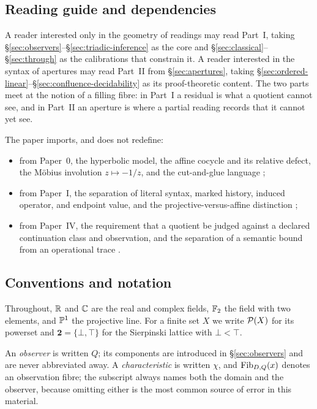 \subsection{Reading guide and dependencies}

A reader interested only in the geometry of readings may read Part~I, taking
\S\ref{sec:observers}--\S\ref{sec:triadic-inference} as the core and
\S\ref{sec:classical}--\S\ref{sec:through} as the calibrations that constrain it.
A reader interested in the syntax of apertures may read Part~II from
\S\ref{sec:apertures}, taking \S\ref{sec:ordered-linear}--\S\ref{sec:confluence-decidability}
as its proof-theoretic content.  The two parts meet at the notion of a filling fibre:
in Part~I a residual is what a quotient cannot see, and in Part~II an aperture is
where a partial reading records that it cannot yet see.

The paper imports, and does not redefine:

\begin{itemize}
\item from Paper~0, the hyperbolic model, the affine cocycle and its relative defect,
  the M\"obius involution $z\mapsto -1/z$, and the cut-and-glue language
  \cite{Yuan2026AEGPaperZero};
\item from Paper~I, the separation of literal syntax, marked history, induced
  operator, and endpoint value, and the projective-versus-affine distinction
  \cite{Yuan2026AEGFoundations};
\item from Paper~IV, the requirement that a quotient be judged against a declared
  continuation class and observation, and the separation of a semantic bound from an
  operational trace \cite{Yuan2026AEGCondensation}.
\end{itemize}

\subsection{Conventions and notation}

Throughout, $\mathbb{R}$ and $\mathbb{C}$ are the real and complex fields, $\mathbb{F}_2$ the field with two
elements, and $\mathbb{P}^1$ the projective line.  For a finite set $X$ we write
$\mathcal P(X)$ for its powerset and $\mathbf 2=\{\bot,\top\}$ for the Sierpinski lattice
with $\bot<\top$.

An \emph{observer} is written $Q$; its components are introduced in
\S\ref{sec:observers} and are never abbreviated away.  A \emph{characteristic} is
written $\chi$, and $\operatorname{Fib}_{D,Q}(x)$ denotes an observation fibre; the subscript
always names both the domain and the observer, because omitting either is the most
common source of error in this material.

